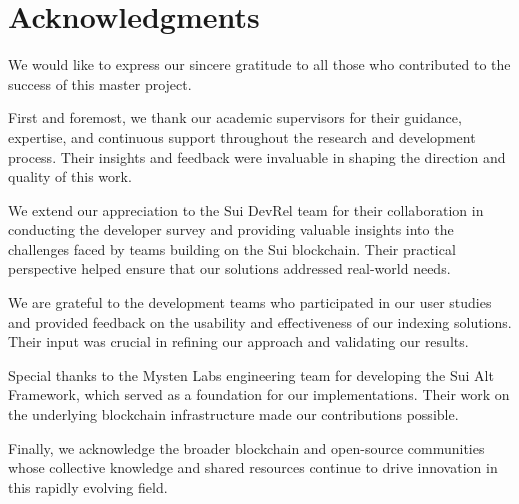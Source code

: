 \section*{Acknowledgments}

We would like to express our sincere gratitude to all those who contributed to the success of this master project.

First and foremost, we thank our academic supervisors for their guidance, expertise, and continuous support throughout the research and development process. Their insights and feedback were invaluable in shaping the direction and quality of this work.

We extend our appreciation to the Sui DevRel team for their collaboration in conducting the developer survey and providing valuable insights into the challenges faced by teams building on the Sui blockchain. Their practical perspective helped ensure that our solutions addressed real-world needs.

We are grateful to the development teams who participated in our user studies and provided feedback on the usability and effectiveness of our indexing solutions. Their input was crucial in refining our approach and validating our results.

Special thanks to the Mysten Labs engineering team for developing the Sui Alt Framework, which served as a foundation for our implementations. Their work on the underlying blockchain infrastructure made our contributions possible.

Finally, we acknowledge the broader blockchain and open-source communities whose collective knowledge and shared resources continue to drive innovation in this rapidly evolving field. 